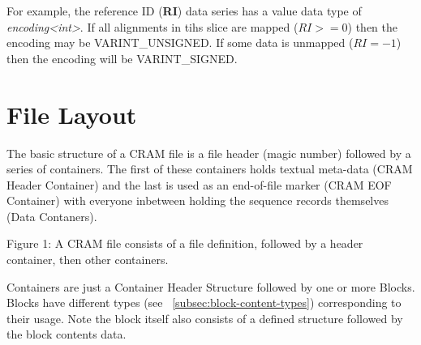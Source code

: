 \documentclass[a4paper]{article}
\begin{document}
\vskip 10pt

For example, the reference ID (\textbf{RI}) data series has a value data type of \textit{encoding<int>}.
If all alignments in tihs slice are mapped ($RI >= 0$) then the encoding may be VARINT\_UNSIGNED.
If some data is unmapped ($RI = -1$) then the encoding will be VARINT\_SIGNED.

\section{File Layout}

The basic structure of a CRAM file is a file header (magic number)
followed by a series of containers.  The first of these containers
holds textual meta-data (CRAM Header Container) and the last is used
as an end-of-file marker (CRAM EOF Container) with everyone inbetween
holding the sequence records themselves (Data Contaners).

\begin{center}

Figure 1: A CRAM file consists of a file definition, followed by a header container, then other containers.
\end{center}

Containers are just a Container Header Structure followed by one or
more Blocks.  Blocks have different types (see
~\ref{subsec:block-content-types}) corresponding to their usage.
Note the block itself also consists of a defined structure followed by
the block contents data.
\end{document}
